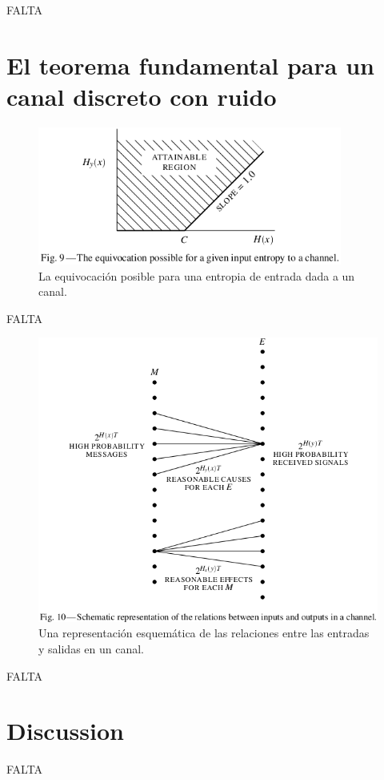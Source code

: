 FALTA

\clearpage

\chapter{El teorema fundamental para un canal discreto con ruido}
\label{sec:13}

\begin{figure}[!ht]
\centerline{\includegraphics[width=100mm]{Imagenes/Pagina22-Figura9.png}}
\caption{La equivocaci\'{o}n posible para una entropia de entrada dada
  a un canal.}
\label{fig:9}
\end{figure}

FALTA

\begin{figure}[!ht]
\centerline{\includegraphics[width=140mm]{Imagenes/Pagina23-Figura10.png}}
\caption{Una representaci\'{o}n esquem\'{a}tica de las relaciones
  entre las entradas y salidas en un canal.}
\label{fig:10}
\end{figure}

FALTA

\clearpage

\chapter{Discussion}
\label{sec:14}

FALTA

